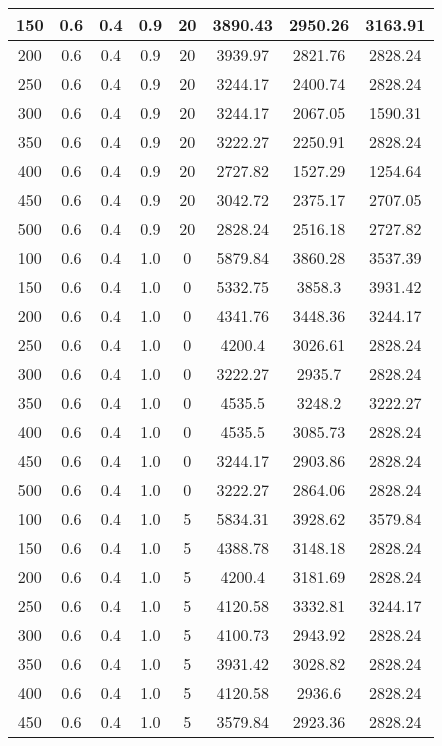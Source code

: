 \documentclass[a4paper, 12pt]{extreport}
\begin{document}
\begin{itemize}
\begin{longtable}{|c|c|c|c|c|c|c|c|}
			150 & 0.6 & 0.4 & 0.9 & 20 & 3890.43 & 2950.26 & 3163.91 \\\hline
			200 & 0.6 & 0.4 & 0.9 & 20 & 3939.97 & 2821.76 & 2828.24 \\\hline
			250 & 0.6 & 0.4 & 0.9 & 20 & 3244.17 & 2400.74 & 2828.24 \\\hline
			300 & 0.6 & 0.4 & 0.9 & 20 & 3244.17 & 2067.05 & 1590.31 \\\hline
			350 & 0.6 & 0.4 & 0.9 & 20 & 3222.27 & 2250.91 & 2828.24 \\\hline
			400 & 0.6 & 0.4 & 0.9 & 20 & 2727.82 & 1527.29 & 1254.64 \\\hline
			450 & 0.6 & 0.4 & 0.9 & 20 & 3042.72 & 2375.17 & 2707.05 \\\hline
			500 & 0.6 & 0.4 & 0.9 & 20 & 2828.24 & 2516.18 & 2727.82 \\\hline
			100 & 0.6 & 0.4 & 1.0 & 0 & 5879.84 & 3860.28 & 3537.39 \\\hline
			150 & 0.6 & 0.4 & 1.0 & 0 & 5332.75 & 3858.3 & 3931.42 \\\hline
			200 & 0.6 & 0.4 & 1.0 & 0 & 4341.76 & 3448.36 & 3244.17 \\\hline
			250 & 0.6 & 0.4 & 1.0 & 0 & 4200.4 & 3026.61 & 2828.24 \\\hline
			300 & 0.6 & 0.4 & 1.0 & 0 & 3222.27 & 2935.7 & 2828.24 \\\hline
			350 & 0.6 & 0.4 & 1.0 & 0 & 4535.5 & 3248.2 & 3222.27 \\\hline
			400 & 0.6 & 0.4 & 1.0 & 0 & 4535.5 & 3085.73 & 2828.24 \\\hline
			450 & 0.6 & 0.4 & 1.0 & 0 & 3244.17 & 2903.86 & 2828.24 \\\hline
			500 & 0.6 & 0.4 & 1.0 & 0 & 3222.27 & 2864.06 & 2828.24 \\\hline
			100 & 0.6 & 0.4 & 1.0 & 5 & 5834.31 & 3928.62 & 3579.84 \\\hline
			150 & 0.6 & 0.4 & 1.0 & 5 & 4388.78 & 3148.18 & 2828.24 \\\hline
			200 & 0.6 & 0.4 & 1.0 & 5 & 4200.4 & 3181.69 & 2828.24 \\\hline
			250 & 0.6 & 0.4 & 1.0 & 5 & 4120.58 & 3332.81 & 3244.17 \\\hline
			300 & 0.6 & 0.4 & 1.0 & 5 & 4100.73 & 2943.92 & 2828.24 \\\hline
			350 & 0.6 & 0.4 & 1.0 & 5 & 3931.42 & 3028.82 & 2828.24 \\\hline
			400 & 0.6 & 0.4 & 1.0 & 5 & 4120.58 & 2936.6 & 2828.24 \\\hline
			450 & 0.6 & 0.4 & 1.0 & 5 & 3579.84 & 2923.36 & 2828.24 \\\hline

\end{longtable}
\end{itemize}
\end{document}
